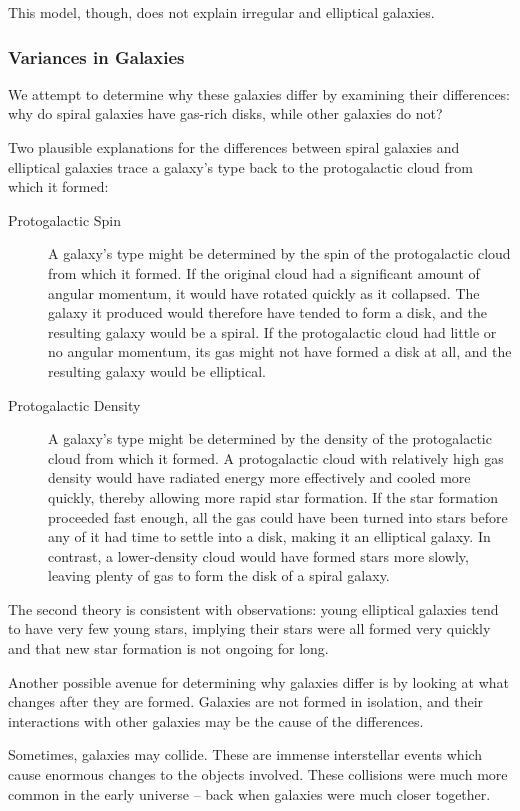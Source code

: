 This model, though, does not explain irregular and elliptical galaxies.

\subsubsection{Variances in Galaxies}
We attempt to determine why these galaxies differ by examining their differences: why do spiral galaxies have gas-rich disks, while other galaxies do not?

Two plausible explanations for the differences between spiral galaxies and elliptical galaxies trace a galaxy’s type back to the protogalactic cloud from which it formed:
\begin{description}
\item[Protogalactic Spin] A galaxy’s type might be determined by the spin of the protogalactic cloud from which it formed. If the original cloud had a significant amount of angular momentum, it would have rotated quickly as it collapsed. The galaxy it produced would therefore have tended to form a disk, and the resulting galaxy would be a spiral. If the protogalactic cloud had little or no angular momentum, its gas might not have formed a disk at all, and the resulting galaxy would be elliptical.
\item[Protogalactic Density] A galaxy’s type might be determined by the density of the protogalactic cloud from which it formed. A protogalactic cloud with relatively high gas density would have radiated energy more effectively and cooled more quickly, thereby allowing more rapid star formation. If the star formation proceeded fast enough, all the gas could have been turned into stars before any of it had time to settle into a disk, making it an elliptical galaxy. In contrast, a lower-density cloud would have formed stars more slowly, leaving plenty of gas to form the disk of a spiral galaxy.
\end{description}

The second theory is consistent with observations: young elliptical galaxies tend to have very few young stars, implying their stars were all formed very quickly and that new star formation is not ongoing for long.

Another possible avenue for determining why galaxies differ is by looking at what changes after they are formed. Galaxies are not formed in isolation, and their interactions with other galaxies may be the cause of the differences.

Sometimes, galaxies may collide. These are immense interstellar events which cause enormous changes to the objects involved. These collisions were much more common in the early universe -- back when galaxies were much closer together.

